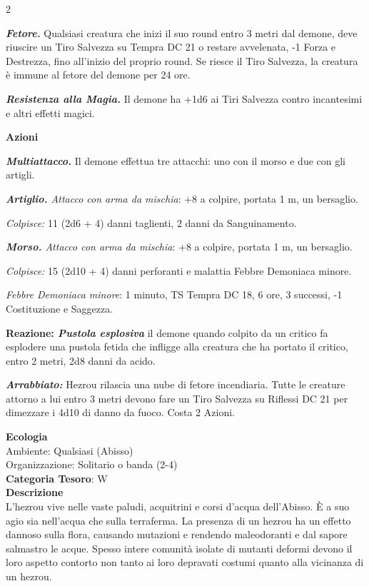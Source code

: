 \begin{multicols}{2}
{\emph{\textbf{Fetore.}} Qualsiasi creatura che inizi il suo round entro 3 metri dal demone, deve riuscire un Tiro Salvezza su Tempra DC 21 o restare avvelenata, -1 Forza e Destrezza, fino all'inizio del proprio round. Se riesce il Tiro Salvezza, la creatura è immune al fetore del demone per 24 ore.

\emph{\textbf{Resistenza alla Magia.}} Il demone ha +1d6 ai Tiri Salvezza contro incantesimi e altri effetti magici.

\textbf{Azioni}

\emph{\textbf{Multiattacco.}} Il demone effettua tre attacchi: uno con il morso e due con gli artigli.

\emph{\textbf{Artiglio.} Attacco con arma da mischia}: +8 a colpire, portata 1 m, un bersaglio.

\emph{Colpisce:} 11 (2d6 + 4) danni taglienti, 2 danni da Sanguinamento.

\emph{\textbf{Morso.} Attacco con arma da mischia}: +8 a colpire, portata 1 m, un bersaglio.

\emph{Colpisce:} 15 (2d10 + 4) danni perforanti e malattia Febbre Demoniaca minore.

\emph{Febbre Demoniaca minore}: 1 minuto, TS Tempra DC 18, 6 ore, 3 successi, -1 Costituzione e Saggezza.

\textbf{Reazione: \emph{Pustola esplosiva}} il demone quando colpito da un critico fa esplodere una pustola fetida che infligge alla creatura che ha portato il critico, entro 2 metri, 2d8 danni da acido.

\emph{\textbf{Arrabbiato:}} Hezrou rilascia una nube di fetore incendiaria. Tutte le creature attorno a lui entro 3 metri devono fare un Tiro Salvezza su Riflessi DC 21 per dimezzare i 4d10 di danno da fuoco. Costa 2 Azioni.

\textbf{Ecologia}\\
Ambiente: Qualsiasi (Abisso)\\
Organizzazione: Solitario o banda (2-4)\\
\textbf{Categoria Tesoro}: W\\
\textbf{Descrizione}\\
L'hezrou vive nelle vaste paludi, acquitrini e corsi d'acqua dell'Abisso. È a suo agio sia nell'acqua che sulla terraferma. La presenza di un hezrou ha un effetto dannoso sulla flora, causando mutazioni e rendendo maleodoranti e dal sapore salmastro le acque. Spesso intere comunità isolate di mutanti deformi devono il loro aspetto contorto non tanto ai loro depravati costumi quanto alla vicinanza di un hezrou.

}
\end{multicols}
